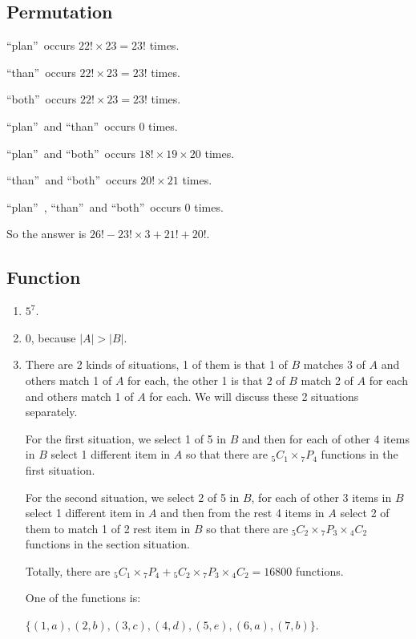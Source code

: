 \documentclass{../../cls/sig-alternate-05-2015}
\begin{document}
\subsection{Permutation}
\textquotedblleft plan\textquotedblright\ occurs $22! \times 23 = 23!$ times.

\textquotedblleft than\textquotedblright\ occurs $22! \times 23 = 23!$ times.

\textquotedblleft both\textquotedblright\ occurs $22! \times 23 = 23!$ times.

\textquotedblleft plan\textquotedblright\ and \textquotedblleft than\textquotedblright\ occurs $0$ times.

\textquotedblleft plan\textquotedblright\ and \textquotedblleft both\textquotedblright\ occurs $18! \times 19 \times 20$ times.

\textquotedblleft than\textquotedblright\ and \textquotedblleft both\textquotedblright\ occurs $20! \times 21$ times.

\textquotedblleft plan\textquotedblright\ , \textquotedblleft than\textquotedblright\ and \textquotedblleft both\textquotedblright\ occurs $0$ times.

So the answer is $26! - 23! \times 3 + 21! + 20!$.

\newpage

\subsection{Function}
\begin{enumerate}
	\item $5^7$.
	\item $0$, because $|A| > |B|$.
	\item There are 2 kinds of situations, 1 of them is that 1 of $B$ matches 3 of $A$ and others match 1 of $A$ for each, the other 1 is that 2 of $B$ match 2 of $A$ for each and others match 1 of $A$ for each. We will discuss these 2 situations separately.
	
	For the first situation, we select 1 of 5 in $B$ and then for each of other 4 items in $B$ select 1 different item in $A$ so that there are ${}_5 C_1 \times {}_7 P_4$ functions in the first situation.
	
	For the second situation, we select 2 of 5 in $B$, for each of other 3 items in $B$ select 1 different item in $A$ and then from the rest 4 items in $A$ select 2 of them to match 1 of 2 rest item in $B$ so that there are ${}_5 C_2 \times {}_7 P_3 \times {}_4 C_2$ functions in the section situation.
	
	Totally, there are ${}_5 C_1 \times {}_7 P_4 + {}_5 C_2 \times {}_7 P_3 \times {}_4 C_2 = 16800$ functions.
	
	One of the functions is: 
	
	$\{(1, a), (2, b), (3, c), (4, d), (5, e), (6, a), (7, b)\}$.
\end{enumerate}
\end{document}
